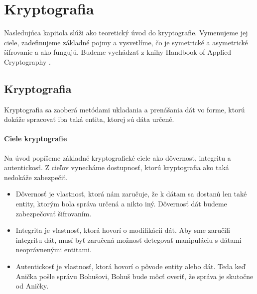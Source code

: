 \chapter{Kryptografia}

Nasledujúca kapitola slúži ako teoretický úvod do kryptografie. Vymenujeme jej ciele, zadefinujeme základné pojmy a vysvetlíme, čo je symetrické a asymetrické šifrovanie a ako fungujú. Budeme vychádzať z knihy Handbook of Applied Cryptography \cite{HOAC}.

\section{Kryptografia}
	Kryptografia sa zaoberá metódami ukladania a prenášania dát vo forme, ktorú dokáže spracovať iba taká entita, ktorej sú dáta určené.
	\subsubsection{Ciele kryptografie}
	Na úvod popíšeme základné kryptografické ciele ako dôvernosť, integritu a autentickosť. Z cieľov vynecháme dostupnosť, ktorú kryptografia ako taká nedokáže zabezpečiť.
		\begin{itemize}
		\item Dôvernosť je vlastnosť, ktorá nám zaručuje, že k dátam sa dostanú len také entity, ktorým bola správa určená a nikto iný. Dôvernosť dát budeme zabezpečovať šifrovaním. 
		\item Integrita je vlastnosť, ktorá hovorí o modifikácii dát. Aby sme zaručili integritu dát, musí byť zaručená možnosť detegovať manipuláciu s dátami neoprávnenými entitami.
		\item Autentickosť je vlastnosť, ktorá hovorí o pôvode entity alebo dát. Teda keď Anička pošle správu Bohušovi, Bohuš bude môcť overiť, že správa je skutočne od Aničky. 
		\end{itemize}

